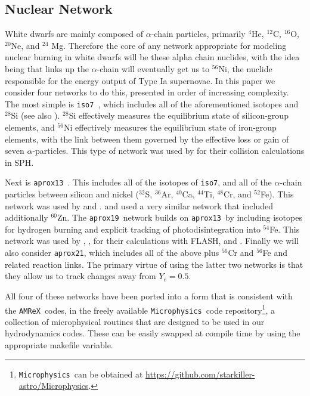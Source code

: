 \documentclass[twocolumn,numberedappendix]{../aastex6}
\newcommand{\amrex}{\texttt{AMReX}}
\newcommand{\microphysics}{\texttt{Microphysics}}
\newcommand{\isoseven}{\texttt{iso7}}
\newcommand{\aproxthirteen}{\texttt{aprox13}}
\newcommand{\aproxnineteen}{\texttt{aprox19}}
\newcommand{\aproxtwentyone}{\texttt{aprox21}}
\begin{document}
\subsection{Nuclear Network}
\label{sec:network}

White dwarfs are mainly composed of $\alpha$-chain particles, primarily ${}^4$He,
${}^{12}$C, ${}^{16}$O, ${}^{20}$Ne, and ${}^{24}$ Mg. Therefore the core of
any network appropriate for modeling nuclear burning in white dwarfs will be
these alpha chain nuclides, with the idea being that links up the $\alpha$-chain
will eventually get us to ${}^{56}$Ni, the nuclide responsible for the
energy output of Type Ia supernovae. In this paper we consider four networks
to do this, presented in order of increasing complexity. The most simple is
\isoseven\ \citep{timmes:2000}, which includes all of the aforementioned isotopes and
${}^{28}$Si (see also \citet{hix:1998}). ${}^{28}$Si effectively measures the
equilibrium state of silicon-group elements, and ${}^{56}$Ni effectively measures
the equilibrium state of iron-group elements, with the link between them governed
by the effective loss or gain of seven $\alpha$-particles. This type of network
was used by \citet{rosswog:2009} for their collision calculations in SPH.

Next is \aproxthirteen\ \citep{timmes:1999,timmes:2000}. This includes
all of the isotopes of \isoseven, and all of the $\alpha$-chain particles between
silicon and nickel (${}^{32}$S, ${}^{36}$Ar, ${}^{40}$Ca, ${}^{44}$Ti, ${}^{48}$Cr,
and ${}^{52}$Fe). This network was used by \citet{hawley:2012} and \citet{raskin:2010}.
\citet{loren-aguilar:2010} and \citet{garcia-senz:2013} used a very similar network
that included additionally ${}^{60}$Zn. The \aproxnineteen\ network \citep{timmes:1999}
builds on \aproxthirteen\ by including isotopes for hydrogen burning and explicit
tracking of photodisintegration into ${}^{54}$Fe. This network was used by
\citet{kushnir:2013}, \citet{kushnir:2014}, \citet{rosswog:2009} for their
calculations with FLASH, and \citet{papish:2015}. Finally we will also
consider \aproxtwentyone, which includes all of the above plus ${}^{56}$Cr
and ${}^{56}$Fe and related reaction links. The primary virtue of using
the latter two networks is that they allow us to track changes away from
$Y_e = 0.5$.

All four of these networks have been ported into a form that is consistent
with the \amrex\ codes, in the freely available \microphysics\ code
repository\footnote{\microphysics\ can be obtained at \url{https://github.com/starkiller-astro/Microphysics}.},
a collection of microphysical routines that are designed to be used in our
hydrodynamics codes. These can be easily swapped at compile time by using the 
appropriate makefile variable.
\end{document}
